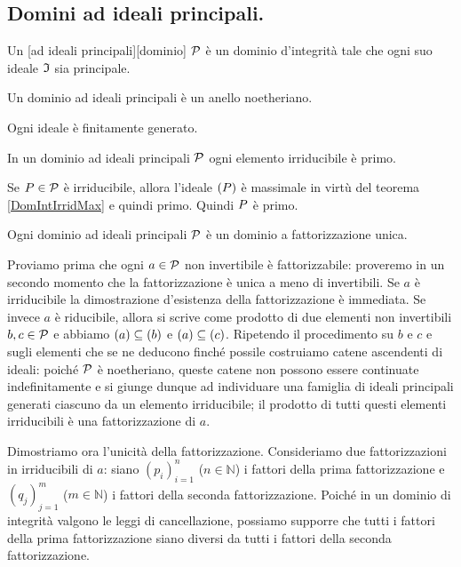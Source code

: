 \subsection{Domini ad ideali principali.}\label{DominiAdIdealiPrinciapli}
\begin{Definition}
	Un [ad ideali principali][dominio] $\mathcal{P}$ \`e un dominio d'integrit\`a tale che ogni suo ideale $\mathfrak{I}$ sia principale.
\end{Definition}
\begin{Theorem}
	Un dominio ad ideali principali \`e un anello noetheriano.
\end{Theorem}
\Proof Ogni ideale \`e finitamente generato. \EndProof
\begin{Theorem}
	In un dominio ad ideali principali $\mathcal{P}$ ogni elemento irriducibile \`e primo.
\end{Theorem}
\Proof Se $P \in \mathcal{P}$ \`e irriducibile, allora l'ideale $\left ( P \right )$ \`e massimale in virt\`u del teorema \ref{DomIntIrridMax} e quindi primo. Quindi $P$ \`e primo. \EndProof
\begin{Theorem}
	Ogni dominio ad ideali principali $\mathcal{P}$ \`e un dominio a fattorizzazione unica.
\end{Theorem}
\Proof Proviamo prima che ogni $a \in \mathcal{P}$ non invertibile \`e fattorizzabile: proveremo in un secondo momento che la fattorizzazione \`e unica a meno di invertibili. Se $a$ \`e irriducibile la dimostrazione d'esistenza della fattorizzazione \`e immediata. Se invece $a$ \`e riducibile, allora si scrive come prodotto di due elementi non invertibili $b, c \in \mathcal{P}$ e abbiamo $\left ( a \right ) \subseteq \left ( b \right )$ e $\left ( a \right ) \subseteq \left ( c \right )$. Ripetendo il procedimento su $b$ e $c$ e sugli elementi che se ne deducono finch\'e possile costruiamo catene ascendenti di ideali: poich\'e $\mathcal{P}$ \`e noetheriano, queste catene non possono essere continuate indefinitamente e si giunge dunque ad individuare una famiglia di ideali principali generati ciascuno da un elemento irriducibile; il prodotto di tutti questi elementi irriducibili \`e una fattorizzazione di $a$.
\par Dimostriamo ora l'unicit\`a della fattorizzazione. Consideriamo due fattorizzazioni in irriducibili di $a$: siano $(p_i)_{i = 1}^n$ ($n \in \mathbb{N}$) i fattori della prima fattorizzazione e $(q_j)_{j = 1}^m$ ($m \in \mathbb{N}$) i fattori della seconda fattorizzazione. Poich\'e in un dominio di integrit\`a valgono le leggi di cancellazione, possiamo supporre che tutti i fattori della prima fattorizzazione siano diversi da tutti i fattori della seconda fattorizzazione.
